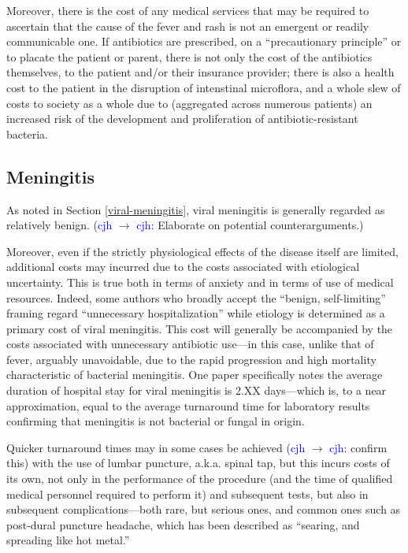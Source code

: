 \documentclass[12pt]{article}
\newcommand{\cjh}{\textcolor{blue}{cjh}}
\newcommand{\msg}[3]{(#1 $\rightarrow$ #2: #3)}
\newcommand{\mcc}[1]{\msg\cjh\cjh{#1}}
\begin{document}
            Moreover, there is the cost of any medical services that may be required to ascertain that the cause of the fever and rash is not an emergent or readily communicable one. If antibiotics are prescribed, on a ``precautionary principle'' or to placate the patient or parent, there is not only the cost of the antibiotics themselves, to the patient and/or their insurance provider; there is also a health cost to the patient in the disruption of intenstinal microflora, and a whole slew of costs to society as a whole due to (aggregated across numerous patients) an increased risk of the development and proliferation of antibiotic-resistant bacteria.

        \subsection{Meningitis}
            \label{cost-meningitis}
            As noted in Section \ref{viral-meningitis}, viral meningitis is generally regarded as relatively benign. \mcc{Elaborate on potential counterarguments.}

            Moreover, even if the strictly physiological effects of the disease itself are limited, additional costs may incurred due to the costs associated with etiological uncertainty. This is true both in terms of anxiety and in terms of use of medical resources. Indeed, some authors who broadly accept the ``benign, self-limiting'' framing regard ``unnecessary hospitalization'' while etiology is determined as a primary cost of viral meningitis\cite{asdf}. This cost will generally be accompanied by the costs associated with unnecessary antibiotic use---in this case, unlike that of fever, arguably unavoidable, due to the rapid progression and high mortality characteristic of bacterial meningitis. One paper\cite{asdf} specifically notes the average duration of hospital stay for viral meningitis is 2.XX days---which is, to a near approximation, equal to the average turnaround time for laboratory results confirming that meningitis is not bacterial or fungal in origin.

            Quicker turnaround times may in some cases be achieved \mcc{confirm this} with the use of lumbar puncture, a.k.a. spinal tap, but this incurs costs of its own, not only in the performance of the procedure (and the time of qualified medical personnel required to perform it) and subsequent tests, but also in subsequent complications---both rare, but serious ones, and common ones such as post-dural puncture headache, which has been described as ``searing, and spreading like hot metal.''\cite{weir2000sharp}
\end{document}
